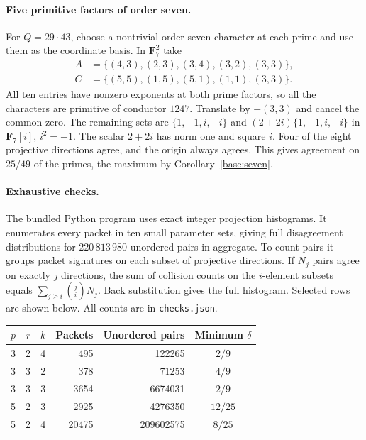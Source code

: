 \documentclass[11pt,letterpaper]{article}
\theoremstyle{remark}
\begin{document}
\paragraph{Five primitive factors of order seven.}
For $Q=29\cdot43$, choose a nontrivial order-seven character at each
prime and use them as the coordinate basis. In $\mathbf F_7^2$ take
\[
\begin{aligned}
 A&=\{(4,3),(2,3),(3,4),(3,2),(3,3)\},\\
 C&=\{(5,5),(1,5),(5,1),(1,1),(3,3)\}.
\end{aligned}
\]
All ten entries have nonzero exponents at both prime factors, so all
the characters are primitive of conductor $1247$. Translate by
$-(3,3)$ and cancel the common zero. The remaining sets are
$\{1,-1,i,-i\}$ and $(2+2i)\{1,-1,i,-i\}$ in
$\mathbf F_7[i]$, $i^2=-1$. The scalar $2+2i$ has norm one
and square $i$. Four of the eight projective directions agree,
and the origin always agrees. This gives agreement on $25/49$ of
the primes, the maximum by Corollary~\ref{base:seven}.

\paragraph{Exhaustive checks.}
The bundled Python program uses exact integer projection histograms.
It enumerates every packet in ten small parameter sets, giving full
disagreement distributions for $220\,813\,980$ unordered pairs in
aggregate. To count pairs it groups packet signatures on each subset
of projective directions. If $N_j$ pairs agree on exactly $j$ directions,
the sum of collision counts on the $i$-element subsets equals
$\sum_{j\ge i}\binom jiN_j$. Back substitution gives the full histogram.
Selected rows are shown below. All counts are in \texttt{checks.json}.
\begin{center}
\begin{tabular}{rrr r r c}
\toprule
$p$ & $r$ & $k$ & Packets & Unordered pairs & Minimum $\delta$\\
\midrule
3 & 2 & 4 & 495 & 122265 & $2/9$\\
3 & 3 & 2 & 378 & 71253 & $4/9$\\
3 & 3 & 3 & 3654 & 6674031 & $2/9$\\
5 & 2 & 3 & 2925 & 4276350 & $12/25$\\
5 & 2 & 4 & 20475 & 209602575 & $8/25$\\
\bottomrule
\end{tabular}
\end{center}
\end{document}
